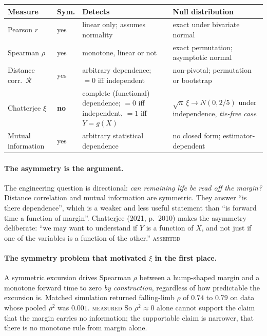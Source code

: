 \documentclass[11pt,a4paper]{article}
\newcommand{\ASSERTED}{\textsc{\textcolor{purple!70!black}{asserted}}}
\newcommand{\MEASURED}{\textsc{\textcolor{green!45!black}{measured}}}
\begin{document}
\begin{center}
\small
\begin{tabular}{@{}p{}p{}p{}p{}@{}}
\toprule
\textbf{Measure} & \textbf{Sym.} & \textbf{Detects} & \textbf{Null distribution}\\
\midrule
Pearson $r$ & yes & linear only; assumes normality & exact under bivariate normal\\
Spearman $\rho$ & yes & monotone, linear or not & exact permutation; asymptotic normal\\
Distance corr.\ $\mathcal{R}$ & yes & arbitrary dependence; $=0$ iff independent &
non-pivotal; permutation or bootstrap\\
Chatterjee $\xi$ & \textbf{no} & complete (functional) dependence; $=0$ iff independent,
$=1$ iff $Y = g(X)$ &
$\sqrt{n}\,\xi \to N(0, 2/5)$ under independence, \emph{tie-free case}\\
Mutual information & yes & arbitrary statistical dependence &
no closed form; estimator-dependent\\
\bottomrule
\end{tabular}
\end{center}

\paragraph{The asymmetry is the argument.} The engineering question is directional:
\emph{can remaining life be read off the margin?} Distance correlation and mutual
information are symmetric. They answer \enquote{is there dependence}, which is a weaker
and less useful statement than \enquote{is forward time a function of margin}. Chatterjee
(2021, p.~2010) makes the asymmetry deliberate:
\enquote{we may want to understand if $Y$ is a function of $X$, and not just if one of the
variables is a function of the other.} \ASSERTED

\paragraph{The symmetry problem that motivated $\xi$ in the first place.} A symmetric
excursion drives Spearman $\rho$ between a hump-shaped margin and a monotone forward time
to zero \emph{by construction}, regardless of how predictable the excursion is. Matched
simulation returned falling-limb $\rho$ of $0.74$ to $0.79$ on data whose pooled $\rho^2$
was $0.001$. \MEASURED{} So $\rho^2 \approx 0$ alone cannot support the claim that the
margin carries no information; the supportable claim is narrower, that there is no
monotone rule from margin alone.
\end{document}
